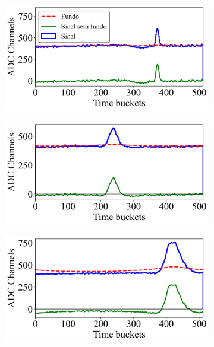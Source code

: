 \documentclass[a4paper,12pt,oneside]{book}
\begin{document}
\begin{figure}[H]
\centering
    \begin{subfigure}[c]{0.45\textwidth}
        \includegraphics[scale=0.45]{figs/bs_fourier_1.png}
        \caption{}
        \label{subfig:bs_fourier_1}
    \end{subfigure}%
    \hfill
    \begin{subfigure}[c]{0.45\textwidth}
        \includegraphics[scale=0.45]{figs/bs_fourier_2.png}
        \caption{}
        \label{subfig:bs_fourier_2}
    \end{subfigure}
    \begin{subfigure}[b]{0.45\textwidth}
        \centering
        \includegraphics[scale=0.45]{figs/bs_fourier_3.png}

\end{subfigure}
\end{figure}
\end{document}
